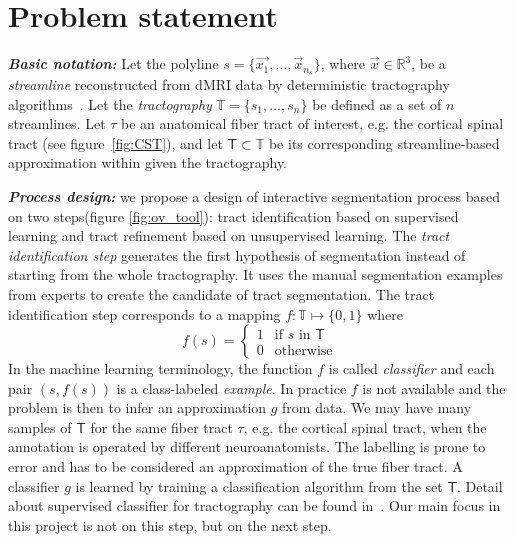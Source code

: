 \section{Problem statement}
\label{sec:problem_statement}
\textbf{\textit{Basic notation:}} Let the polyline $s =\{ \vec{x_1},\ldots,\vec{x}_{n_s}\}$, where $\vec{x} \in \mathbb{R}^3$, be a \emph{streamline} reconstructed from dMRI data by deterministic tractography algorithms~\cite{mori2002fiber}. Let the \emph{tractography} $ \mathbb{T}  = \{s_1,\ldots,s_n\}$ be defined as a set of $n$ streamlines. 
Let $\tau$ be an anatomical fiber tract of interest, e.g. the cortical spinal tract (see figure~\ref{fig:CST}), and let $\mathsf {T} \subset \mathbb{T}$ be its corresponding streamline-based approximation within given the tractography.

\textbf{\textit{Process design:}} we propose a design of interactive segmentation process based on two steps(figure \ref{fig:ov_tool}): tract identification based on supervised learning and tract refinement based on unsupervised learning.
The \emph{tract identification step} generates the first hypothesis of segmentation instead of starting from the whole tractography. It uses the manual segmentation examples from experts to create the candidate of tract segmentation.  The tract identification step  corresponds to a mapping $f : \mathbb{T} \mapsto \{0,1\}$ where
\begin{equation}
\label{eq:neuroanatomist_f}
f(s) =
\left\{
  \begin{array}{rl}
    1 & \mbox{if } s \mbox{ in } \mathsf{T} \\
    0 & \mbox{otherwise}
  \end{array}
\right.
\end{equation}
In the machine learning terminology, the function $f$ is called \emph{classifier} and each pair $(s,f(s))$ is a class-labeled
\emph{example}. In practice $f$ is not available %
and the problem is then to infer an approximation $g$ from data. We
may have many samples of $\mathsf{T}$ for the same fiber tract $\tau$, e.g. the
cortical spinal tract, when the annotation is operated by different neuroanatomists. The labelling is prone to error and has to be considered an approximation of the true fiber tract. A classifier $g$ is learned by training a classification
algorithm from the set $\mathsf{T}$.
Detail about supervised classifier for tractography can be found in~\cite{olivetti2011supervised}. Our main focus in this project is not on this step, but on the next step.

